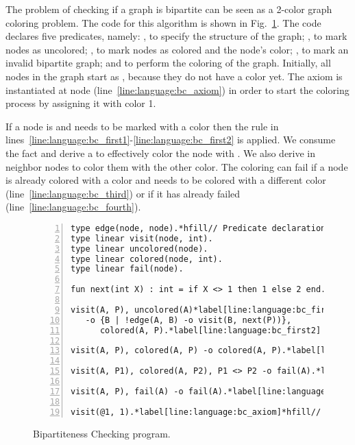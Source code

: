 The problem of checking if a graph is bipartite can be seen as a 2-color graph
coloring problem. The code for this algorithm is shown in
Fig.~\ref{language:code:bichecking}. The code declares five predicates, namely:
, to specify the structure of the graph; , to mark
nodes as uncolored; , to mark nodes as colored and the node's
color; , to mark an invalid bipartite graph; and  to
perform the coloring of the graph.  Initially, all nodes in the graph start as
, because they do not have a color yet. The axiom
 is instantiated at node 
(line~\ref{line:language:bc_axiom}) in order to start the coloring process by
assigning it with color 1.

If a node is  and needs to be marked with a color  then
the rule in lines~\ref{line:language:bc_first1}-\ref{line:language:bc_first2} is
applied. We consume the  fact and derive a 
to effectively color the node with . We also derive  in neighbor nodes to color them with the other color.  The coloring
can fail if a node is already colored with a color  and needs to be
colored with a different color (line~\ref{line:language:bc_third}) or if it has
already failed (line~\ref{line:language:bc_fourth}).

\begin{figure}[h!]
\begin{Verbatim}[numbers=left,fontsize=\codesize,commandchars=\*\[\]]
type edge(node, node).*hfill// Predicate declaration.
type linear visit(node, int).
type linear uncolored(node).
type linear colored(node, int).
type linear fail(node).

fun next(int X) : int = if X <> 1 then 1 else 2 end.*hfill// Function declaration.

visit(A, P), uncolored(A)*label[line:language:bc_first1]*hfill// Rule 1: coloring a node.
   -o {B | !edge(A, B) -o visit(B, next(P))},
      colored(A, P).*label[line:language:bc_first2]

visit(A, P), colored(A, P) -o colored(A, P).*label[line:language:bc_second]*hfill// Rule 2: node is already colored.

visit(A, P1), colored(A, P2), P1 <> P2 -o fail(A).*label[line:language:bc_third]*hfill// Rule 3: graph is not bipartite.

visit(A, P), fail(A) -o fail(A).*label[line:language:bc_fourth]*hfill// Rule 4: graph is still not bipartite.

visit(@1, 1).*label[line:language:bc_axiom]*hfill// Initial facts.
\end{Verbatim}
  \caption{Bipartiteness Checking program.}
  \label{language:code:bichecking}
\end{figure}

